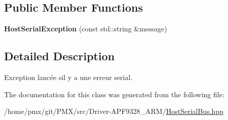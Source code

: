 \subsection*{Public Member Functions}
\begin{DoxyCompactItemize}
\item 
\mbox{\label{classHostSerialException_a584b75891e990bbaabd283fbf006b292}} 
{\bfseries Host\+Serial\+Exception} (const std\+::string \&message)
\end{DoxyCompactItemize}


\subsection{Detailed Description}
Exception lancée s\textquotesingle{}il y a une erreur serial. 

The documentation for this class was generated from the following file\+:\begin{DoxyCompactItemize}
\item 
/home/pmx/git/\+P\+M\+X/src/\+Driver-\/\+A\+P\+F9328\+\_\+\+A\+R\+M/\hyperlink{HostSerialBus_8hpp}{Host\+Serial\+Bus.\+hpp}\end{DoxyCompactItemize}
